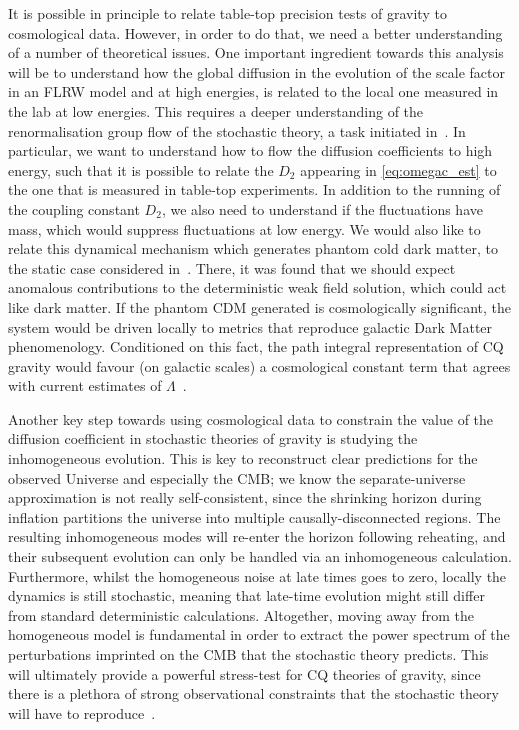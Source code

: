 \documentclass[amsmath,amssymb,11pt]{article}
\begin{document}
It is possible in principle to relate table-top precision tests of gravity to cosmological data. However, in order to do that, we need a better understanding of a number of theoretical issues. One important ingredient towards this analysis will be to understand how the global diffusion in the evolution of the scale factor in an FLRW model and at high energies, is related to the local one measured in the lab at low energies.
This requires a deeper understanding of the renormalisation group flow of the stochastic theory, a task initiated in~\cite{grudka2024renormalisation}. In particular, we want to understand how to flow the diffusion coefficients to high energy, such that it is possible to relate the $D_2$ appearing in \eqref{eq:omegac_est} to the one that is measured in table-top experiments. In addition to the running of the coupling constant $D_2$, we also need to understand if the fluctuations have mass, which would suppress fluctuations at low energy.
We would also like to relate this dynamical mechanism which generates phantom cold dark matter, to the static case considered in~\cite{oppenheim2024anomalous}. There, it was found that we should expect anomalous contributions to the deterministic weak field solution, which could act like dark matter. If the phantom CDM generated is cosmologically significant, the system would be driven locally to metrics that reproduce galactic Dark Matter phenomenology. Conditioned on this fact, the path integral representation of CQ gravity would favour (on galactic scales) a cosmological constant term that agrees with current estimates of $\Lambda$~\cite{oppenheim2024anomalous}.

Another key step towards using cosmological data to constrain the value of the diffusion coefficient in stochastic theories of gravity is studying the inhomogeneous evolution. This is key to reconstruct clear predictions for the observed Universe and especially the CMB; we know the separate-universe approximation is not really self-consistent, since the shrinking horizon during inflation partitions the universe into multiple causally-disconnected regions. The resulting inhomogeneous modes will re-enter the horizon following reheating, and their subsequent evolution can only be handled via an inhomogeneous calculation. Furthermore, whilst the homogeneous noise at late times goes to zero, locally the dynamics is still stochastic, meaning that late-time evolution might still differ from standard deterministic calculations. Altogether, moving away from the homogeneous model is fundamental in order to extract the power spectrum of the perturbations imprinted on the CMB that the stochastic theory predicts. This will ultimately provide a powerful stress-test for CQ theories of gravity, since there is a plethora of strong observational constraints that the stochastic theory will have to reproduce~\cite{aghanim2020planck}.
\end{document}
